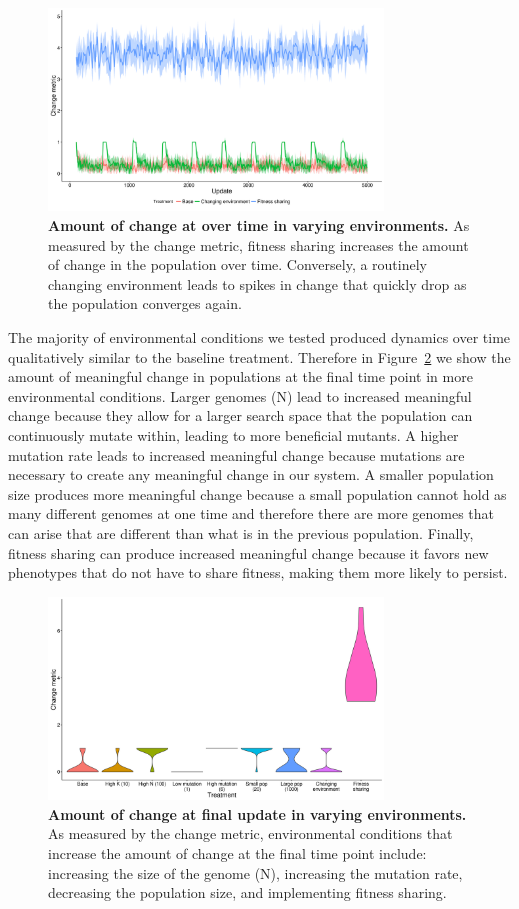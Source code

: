 \documentclass[letterpaper]{article}
\begin{document}
\begin{figure}
\includegraphics[width=3.5in]{figs/change_changing_environments.png}
\caption{\textbf{Amount of change at over time in varying environments.} As measured by the change metric, fitness sharing increases the amount of change in the population over time. Conversely, a routinely changing environment leads to spikes in change that quickly drop as the population converges again.}
\label{change_time}
\end{figure}

The majority of environmental conditions we tested produced dynamics over time qualitatively similar to the baseline treatment. Therefore in Figure~\ref{change} we show the amount of meaningful change in populations at the final time point in more environmental conditions. Larger genomes (N) lead to increased meaningful change because they allow for a larger search space that the population can continuously mutate within, leading to more beneficial mutants. A higher mutation rate leads to increased meaningful change because mutations are necessary to create any meaningful change in our system. A smaller population size produces more meaningful change because a small population cannot hold as many different genomes at one time and therefore there are more genomes that can arise that are different than what is in the previous population. Finally, fitness sharing can produce increased meaningful change because it favors new phenotypes that do not have to share fitness, making them more likely to persist.

\begin{figure}
\includegraphics[width=3.5in]{figs/changeboxplots.png}
\caption{\textbf{Amount of change at final update in varying environments.} As measured by the change metric, environmental conditions that increase the amount of change at the final time point include: increasing the size of the genome (N), increasing the mutation rate, decreasing the population size, and implementing fitness sharing.}
\label{change}
\end{figure}
\end{document}
